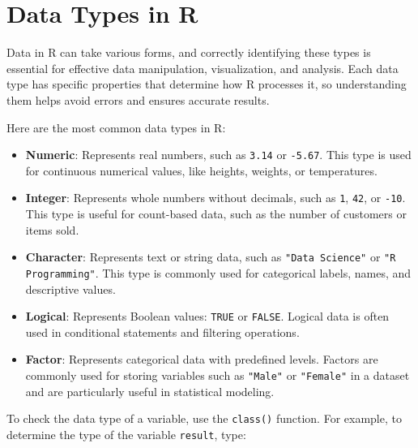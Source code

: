 \documentclass[
  11pt,
]{book}
\newcommand{\passthrough}[1]{#1}
\providecommand{\tightlist}{%
  \setlength{\itemsep}{0pt}\setlength{\parskip}{0pt}}
\theoremstyle{definition}
\theoremstyle{definition}
\theoremstyle{definition}
\theoremstyle{definition}
\theoremstyle{remark}
\begin{document}
\section{Data Types in R}\label{data-types-in-r}

Data in R can take various forms, and correctly identifying these types is essential for effective data manipulation, visualization, and analysis. Each data type has specific properties that determine how R processes it, so understanding them helps avoid errors and ensures accurate results.

Here are the most common data types in R:

\begin{itemize}
\tightlist
\item
  \textbf{Numeric}: Represents real numbers, such as \passthrough{\lstinline!3.14!} or \passthrough{\lstinline!-5.67!}. This type is used for continuous numerical values, like heights, weights, or temperatures.\\
\item
  \textbf{Integer}: Represents whole numbers without decimals, such as \passthrough{\lstinline!1!}, \passthrough{\lstinline!42!}, or \passthrough{\lstinline!-10!}. This type is useful for count-based data, such as the number of customers or items sold.\\
\item
  \textbf{Character}: Represents text or string data, such as \passthrough{\lstinline!"Data Science"!} or \passthrough{\lstinline!"R Programming"!}. This type is commonly used for categorical labels, names, and descriptive values.\\
\item
  \textbf{Logical}: Represents Boolean values: \passthrough{\lstinline!TRUE!} or \passthrough{\lstinline!FALSE!}. Logical data is often used in conditional statements and filtering operations.\\
\item
  \textbf{Factor}: Represents categorical data with predefined levels. Factors are commonly used for storing variables such as \passthrough{\lstinline!"Male"!} or \passthrough{\lstinline!"Female"!} in a dataset and are particularly useful in statistical modeling.
\end{itemize}

To check the data type of a variable, use the \passthrough{\lstinline!class()!} function. For example, to determine the type of the variable \passthrough{\lstinline!result!}, type:
\end{document}
